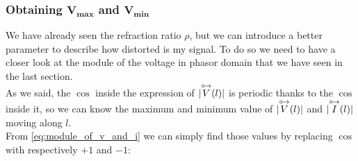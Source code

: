 \subsubsection*{Obtaining $\bm{V_{max}}$ and $\bm{V_{min}}$}
We have already seen the refraction ratio $\rho$, but we can introduce a better parameter to describe how distorted is my signal. To do so we need to have a closer look at the module of the voltage in phasor domain that we have seen in the last section.\\
As we said, the $\cos$ inside the expression of $|\overset{\mathbin {{\circ \mkern-2.5mu\rightarrow}}}{V}(l)|$ is periodic thanks to the $\cos$ inside it, so we can know the maximum and minimum value of $|\overset{\mathbin {{\circ \mkern-2.5mu\rightarrow}}}{V}(l)|$ and $|\overset{\mathbin {{\circ \mkern-2.5mu\rightarrow}}}{I}(l)|$ moving along $l$.\\
From \cref{eq:module_of_v_and_i} we can simply find those values by replacing $\cos$ with respectively $+1$ and $-1$:


